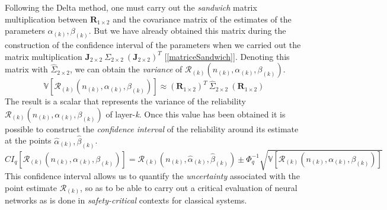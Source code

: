 \documentclass[10pt]{article} %
\begin{document}
Following the Delta method, one must carry out the \textit{sandwich} matrix multiplication between $\mathbf{R}_{1\times2}$ and the covariance matrix of the estimates of the parameters $\alpha_{(k)}, \beta_{(k)}$. But we have already obtained this matrix during the construction of the confidence interval of the parameters when we carried out the matrix multiplication $\mathbf{J}_{2\times2}\ \Sigma_{2\times2}\ (\mathbf{J}_{2\times2})^{T}$ [\ref{matriceSandwich}]. Denoting this matrix with $\hat{\Sigma}_{2\times2}$, we can obtain the \textit{variance} of $\mathcal{R}_{(k)}(n_{(k)}, \alpha_{(k)}, \beta_{(k)})$.
\begin{equation}
    \mathbb{V}[\mathcal{R}_{(k)}(n_{(k)}, \alpha_{(k)}, \beta_{(k)})] \approx (\mathbf{R}_{1\times2})^{T}\ \hat{\Sigma}_{2\times2} \ (\mathbf{R}_{1\times2})  
\end{equation}
The result is a scalar that represents the variance of the reliability $\mathcal{R}_{(k)}(n_{(k)}, \alpha_{(k)}, \beta_{(k)})$ of layer-\textit{k}. Once this value has been obtained it is possible to construct the \textit{confidence interval} of the reliability around its estimate at the points $\hat{\alpha}_{(k)},\hat{\beta}_{(k)}$.
\begin{equation}
    CI_{q}[\mathcal{R}_{(k)}(n_{(k)}, \alpha_{(k)}, \beta_{(k)})] = \mathcal{R}_{(k)}(n_{(k)}, \hat{\alpha}_{(k)}, \hat{\beta}_{(k)}) \pm \Phi^{-1}_{q}\sqrt{\mathbb{V}[\mathcal{R}_{(k)}(n_{(k)}, \alpha_{(k)}, \beta_{(k)})]}
\end{equation}
This confidence interval allows us to quantify the \textit{uncertainty} associated with the point estimate $\mathcal{R}_{(k)}$, so as to be able to carry out a critical evaluation of neural networks as is done in \textit{safety-critical} contexts for classical systems.
\end{document}

